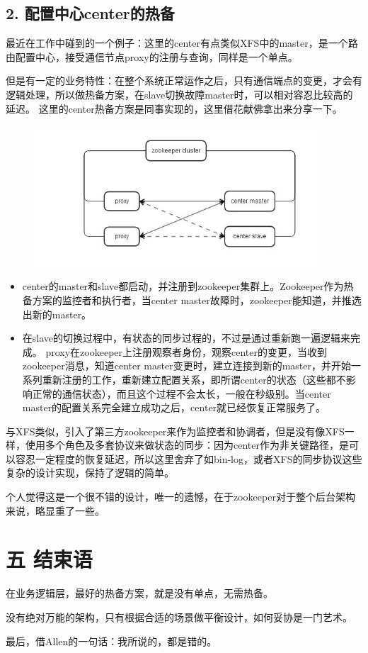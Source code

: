 {    \subsection* {2. 配置中心center的热备} {
        {最近在工作中碰到的一个例子：这里的center有点类似XFS中的master，是一个路由配置中心，接受通信节点proxy的注册与查询，同样是一个单点。}\par
        {但是有一定的业务特性：在整个系统正常运作之后，只有通信端点的变更，才会有逻辑处理，所以做热备方案，在slave切换故障master时，可以相对容忍比较高的延迟。 这里的center热备方案是同事实现的，这里借花献佛拿出来分享一下。 } \par
        \begin {figure}[htbp]
            \centering
            \includegraphics [width=300pt, keepaspectratio] {center.jpg}
        \end {figure}
        \begin{itemize}
            \item{center的master和slave都启动，并注册到zookeeper集群上。Zookeeper作为热备方案的监控者和执行者，当center master故障时，zookeeper能知道，并推选出新的master。}
            \item{在slave的切换过程中，有状态的同步过程的，不过是通过重新跑一遍逻辑来完成。 proxy在zookeeper上注册观察者身份，观察center的变更，当收到zookeeper消息，知道center master变更时，建立连接到新的master，并开始一系列重新注册的工作，重新建立配置关系，即所谓center的状态（这些都不影响正常的通信状态），而且这个过程不会太长，一般在秒级别。当center master的配置关系完全建立成功之后，center就已经恢复正常服务了。}
        \end{itemize}
        \par
        {与XFS类似，引入了第三方zookeeper来作为监控者和协调者，但是没有像XFS一样，使用多个角色及多套协议来做状态的同步：因为center作为非关键路径，是可以容忍一定程度的恢复延迟，所以这里舍弃了如bin-log，或者XFS的同步协议这些复杂的设计实现，保持了逻辑的简单。}\par
        {个人觉得这是一个很不错的设计，唯一的遗憾，在于zookeeper对于整个后台架构来说，略显重了一些。}\par
    }
}


\section* {\Large \ZHH 五 结束语} {
    {在业务逻辑层，最好的热备方案，就是没有单点，无需热备。}\par
    {没有绝对万能的架构，只有根据合适的场景做平衡设计，如何妥协是一门艺术。}\par
    {最后，借Allen的一句话：我所说的，都是错的。}\par
}


